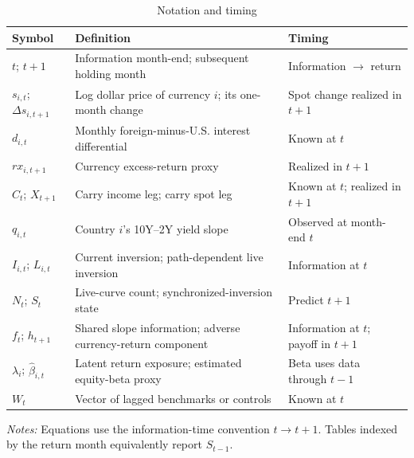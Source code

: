 \begin{table}[H]
\centering
\caption{Notation and timing}
\label{tab:notation}
\small
\begin{tabularx}{\textwidth}{>{\raggedright\arraybackslash}p{2.1cm} >{\raggedright\arraybackslash}X >{\raggedright\arraybackslash}p{3.0cm}}
\toprule
Symbol & Definition & Timing \\
\midrule
$t$; $t+1$ & Information month-end; subsequent holding month & Information $\rightarrow$ return \\
$s_{i,t}$; $\Delta s_{i,t+1}$ & Log dollar price of currency $i$; its one-month change & Spot change realized in $t+1$ \\
$d_{i,t}$ & Monthly foreign-minus-U.S. interest differential & Known at $t$ \\
$rx_{i,t+1}$ & Currency excess-return proxy & Realized in $t+1$ \\
$C_t$; $X_{t+1}$ & Carry income leg; carry spot leg & Known at $t$; realized in $t+1$ \\
$q_{i,t}$ & Country $i$'s 10Y--2Y yield slope & Observed at month-end $t$ \\
$I_{i,t}$; $L_{i,t}$ & Current inversion; path-dependent live inversion & Information at $t$ \\
$N_t$; $S_t$ & Live-curve count; synchronized-inversion state & Predict $t+1$ \\
$f_t$; $h_{t+1}$ & Shared slope information; adverse currency-return component & Information at $t$; payoff in $t+1$ \\
$\lambda_i$; $\widehat\beta_{i,t}$ & Latent return exposure; estimated equity-beta proxy & Beta uses data through $t-1$ \\
$W_t$ & Vector of lagged benchmarks or controls & Known at $t$ \\
\bottomrule
\end{tabularx}
\begin{minipage}{0.94\textwidth}
\footnotesize\emph{Notes:} Equations use the information-time convention $t\rightarrow t+1$. Tables indexed by the return month equivalently report $S_{t-1}$.
\end{minipage}
\end{table}
